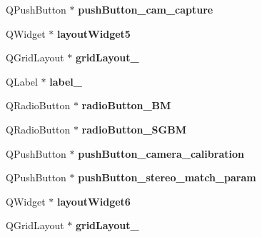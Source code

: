 \begin{DoxyCompactItemize}
\item 
\hypertarget{class_ui___main_window_a65b3c0470d73019b73f13912ce874c60}{}Q\+Push\+Button $\ast$ {\bfseries push\+Button\+\_\+cam\+\_\+capture}\label{class_ui___main_window_a65b3c0470d73019b73f13912ce874c60}

\item 
\hypertarget{class_ui___main_window_a200124ca7d59a2a338363af2942846a6}{}Q\+Widget $\ast$ {\bfseries layout\+Widget5}\label{class_ui___main_window_a200124ca7d59a2a338363af2942846a6}

\item 
\hypertarget{class_ui___main_window_a20728ed83bf740332bd908ea3e15ace6}{}Q\+Grid\+Layout $\ast$ {\bfseries grid\+Layout\+\_}\label{class_ui___main_window_a20728ed83bf740332bd908ea3e15ace6}

\item 
\hypertarget{class_ui___main_window_a4f12a71b4a2fb6f85df2300d83b5ed3e}{}Q\+Label $\ast$ {\bfseries label\+\_}\label{class_ui___main_window_a4f12a71b4a2fb6f85df2300d83b5ed3e}

\item 
\hypertarget{class_ui___main_window_ac88bc8d5e17fa05a6230e3076fe1d790}{}Q\+Radio\+Button $\ast$ {\bfseries radio\+Button\+\_\+\+B\+M}\label{class_ui___main_window_ac88bc8d5e17fa05a6230e3076fe1d790}

\item 
\hypertarget{class_ui___main_window_a6ca62514eb7192249d849988595747c9}{}Q\+Radio\+Button $\ast$ {\bfseries radio\+Button\+\_\+\+S\+G\+B\+M}\label{class_ui___main_window_a6ca62514eb7192249d849988595747c9}

\item 
\hypertarget{class_ui___main_window_a7504e7aa409886f0d6f577a9c305d88e}{}Q\+Push\+Button $\ast$ {\bfseries push\+Button\+\_\+camera\+\_\+calibration}\label{class_ui___main_window_a7504e7aa409886f0d6f577a9c305d88e}

\item 
\hypertarget{class_ui___main_window_a6ba9fbb2c327428701160f7ec43fc3d3}{}Q\+Push\+Button $\ast$ {\bfseries push\+Button\+\_\+stereo\+\_\+match\+\_\+param}\label{class_ui___main_window_a6ba9fbb2c327428701160f7ec43fc3d3}

\item 
\hypertarget{class_ui___main_window_a7a9ee0fe03def9f5fa802288651af9b4}{}Q\+Widget $\ast$ {\bfseries layout\+Widget6}\label{class_ui___main_window_a7a9ee0fe03def9f5fa802288651af9b4}

\item 
\hypertarget{class_ui___main_window_a1f91d05a063890efd359caac0338c7b0}{}Q\+Grid\+Layout $\ast$ {\bfseries grid\+Layout\+\_}\label{class_ui___main_window_a1f91d05a063890efd359caac0338c7b0}


\end{DoxyCompactItemize}
